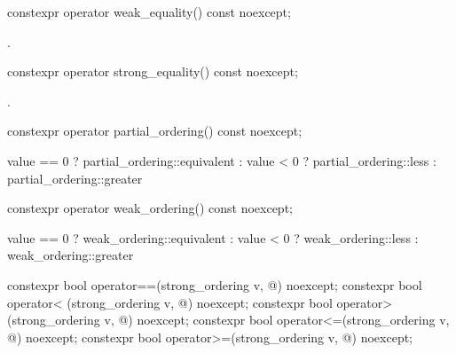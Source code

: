 %
\begin{itemdecl}
constexpr operator weak_equality() const noexcept;
\end{itemdecl}

\begin{itemdescr}
\pnum
\returns
{}.
\end{itemdescr}

%
\begin{itemdecl}
constexpr operator strong_equality() const noexcept;
\end{itemdecl}

\begin{itemdescr}
\pnum
\returns
{}.
\end{itemdescr}

%
\begin{itemdecl}
constexpr operator partial_ordering() const noexcept;
\end{itemdecl}

\begin{itemdescr}
\pnum
\returns
\begin{codeblock}
value == 0 ? partial_ordering::equivalent :
value < 0  ? partial_ordering::less :
             partial_ordering::greater
\end{codeblock}
\end{itemdescr}

%
\begin{itemdecl}
constexpr operator weak_ordering() const noexcept;
\end{itemdecl}

\begin{itemdescr}
\pnum
\returns
\begin{codeblock}
value == 0 ? weak_ordering::equivalent :
value < 0  ? weak_ordering::less :
             weak_ordering::greater
\end{codeblock}
\end{itemdescr}

%
%
%
%
%
\begin{itemdecl}
constexpr bool operator==(strong_ordering v, @\unspec@) noexcept;
constexpr bool operator< (strong_ordering v, @\unspec@) noexcept;
constexpr bool operator> (strong_ordering v, @\unspec@) noexcept;
constexpr bool operator<=(strong_ordering v, @\unspec@) noexcept;
constexpr bool operator>=(strong_ordering v, @\unspec@) noexcept;
\end{itemdecl}

